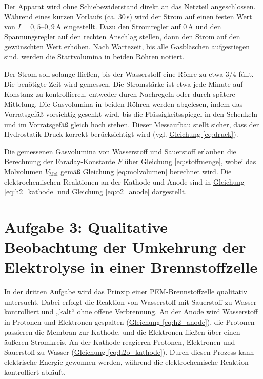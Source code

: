 Der Apparat wird ohne Schiebewiderstand direkt an das Netzteil angeschlossen. Während eines kurzen Vorlaufs (ca. 30\,s) wird der Strom auf einen festen Wert von $I = 0,5$–$0,9$\,A eingestellt. Dazu den Stromregler auf 0\,A und den Spannungsregler auf den rechten Anschlag stellen, dann den Strom auf den gewünschten Wert erhöhen. Nach Wartezeit, bis alle Gasbläschen aufgestiegen sind, werden die Startvolumina in beiden Röhren notiert.  

Der Strom soll solange fließen, bis der Wasserstoff eine Röhre zu etwa 3/4 füllt. Die benötigte Zeit wird gemessen. Die Stromstärke ist etwa jede Minute auf Konstanz zu kontrollieren, entweder durch Nachregeln oder durch spätere Mittelung. Die Gasvolumina in beiden Röhren werden abgelesen, indem das Vorratsgefäß vorsichtig gesenkt wird, bis die Flüssigkeitsspiegel in den Schenkeln und im Vorratsgefäß gleich hoch stehen. Dieser Messaufbau stellt sicher, dass der Hydrostatik-Druck korrekt berücksichtigt wird (vgl. \hyperref[eq:druck]{Gleichung \ref*{eq:druck}}).  

Die gemessenen Gasvolumina von Wasserstoff und Sauerstoff erlauben die Berechnung der Faraday-Konstante $F$ über \hyperref[eq:stoffmenge]{Gleichung \ref*{eq:stoffmenge}}, wobei das Molvolumen $V_\mathrm{Mol}$ gemäß \hyperref[eq:molvolumen]{Gleichung \ref*{eq:molvolumen}} berechnet wird. Die elektrochemischen Reaktionen an der Kathode und Anode sind in \hyperref[eq:h2_kathode]{Gleichung \ref*{eq:h2_kathode}} und \hyperref[eq:o2_anode]{Gleichung \ref*{eq:o2_anode}} dargestellt.

\section*{Aufgabe 3: Qualitative Beobachtung der Umkehrung der Elektrolyse in einer Brennstoffzelle}

In der dritten Aufgabe wird das Prinzip einer PEM-Brennstoffzelle qualitativ untersucht. Dabei erfolgt die Reaktion von Wasserstoff mit Sauerstoff zu Wasser kontrolliert und „kalt“ ohne offene Verbrennung. An der Anode wird Wasserstoff in Protonen und Elektronen gespalten (\hyperref[eq:h2_anode]{Gleichung \ref*{eq:h2_anode}}), die Protonen passieren die Membran zur Kathode, und die Elektronen fließen über einen äußeren Stromkreis. An der Kathode reagieren Protonen, Elektronen und Sauerstoff zu Wasser (\hyperref[eq:h2o_kathode]{Gleichung \ref*{eq:h2o_kathode}}). Durch diesen Prozess kann elektrische Energie gewonnen werden, während die elektrochemische Reaktion kontrolliert abläuft.
